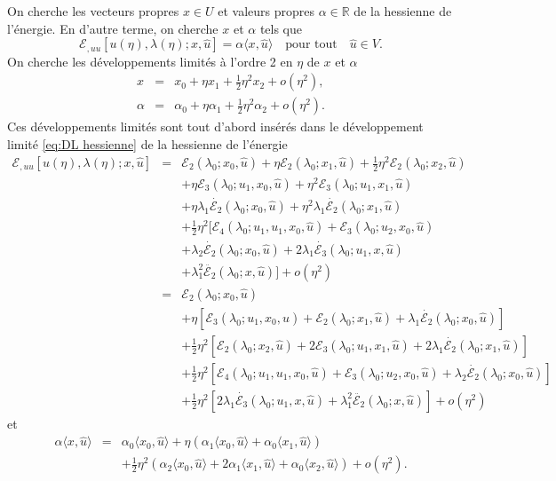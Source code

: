 \documentclass{article}
\begin{document}
On cherche les vecteurs propres $x∈U$ et valeurs propres $\alpha \in
\mathbb{R}$ de la hessienne de l'énergie. En d'autre terme, on cherche $x$
et $\alpha$ tels que
\begin{equation}
  \mathcal{E}_{, u  u} [u (\eta), λ (\eta) ; x, \hat{u}] =
  \alpha \langle x, \hat{u} \rangle \quad \text{pour tout} \quad \hat{u} \in
  V.
\end{equation}
On cherche les développements limités à l'ordre 2 en $\eta$ de $x$
et $\alpha$
\begin{eqnarray*}
  x & = & x_0 + \eta x_1 + \tfrac{1}{2} \eta^2 x_2 + o (\eta^2),\\
  \alpha & = & \alpha_0 + \eta \alpha_1 + \tfrac{1}{2} \eta^2 \alpha_2 + o
  (\eta^2) .
\end{eqnarray*}
Ces développements limités sont tout d'abord insérés dans le
développement limité \eqref{eq:DL hessienne} de la hessienne de
l'énergie
\begin{eqnarray*}
  \mathcal{E}_{, u  u} [u (\eta), λ (\eta) ; x, \hat{u}] & = &
  \mathcal{E}_2 (λ_0 ; x_0, \hat{u}) + \eta \mathcal{E}_2 (λ_0 ;
  x_1, \hat{u}) + \tfrac{1}{2} \eta^2 \mathcal{E}_2 (λ_0 ; x_2,
  \hat{u})\\
  &  & + \eta \mathcal{E}_3 (λ_0 ; u_1, x_0, \hat{u}) + \eta^2
  \mathcal{E}_3 (λ_0 ; u_1, x_1, \hat{u})\\
  &  & + \eta λ_1  \dot{\mathcal{E}_2} (λ_0 ; x_0, \hat{u}) +
  \eta^2 λ_1  \dot{\mathcal{E}_2} (λ_0 ; x_1, \hat{u})\\
  &  & + \tfrac{1}{2} \eta^2  [\mathcal{E}_4 (λ_0 ; u_1, u_1, x_0,
  \hat{u})  +\mathcal{E}_3 (λ_0 ; u_2, x_0, \hat{u})\\
  &  & + λ_2  \dot{\mathcal{E}_2} (λ_0 ; x_0, \hat{u}) + 2
  λ_1  \dot{\mathcal{E}_3} (λ_0 ; u_1, x, \hat{u})\\
  &  & + λ_1^2  \ddot{\mathcal{E}_2} (λ_0 ; x, \hat{u})
  ] + o (\eta^2)\\
  & = & \mathcal{E}_2 (λ_0 ; x_0, \hat{u})\\
  &  & + \eta [\mathcal{E}_3 (λ_0 ; u_1, x_0, \hat{u}) +\mathcal{E}_2
  (λ_0 ; x_1, \hat{u}) + λ_1  \dot{\mathcal{E}_2} (λ_0 ;
  x_0, \hat{u})]\\
  &  & + \tfrac{1}{2} \eta^2  [\mathcal{E}_2 (λ_0 ; x_2, \hat{u}) +
  2\mathcal{E}_3 (λ_0 ; u_1, x_1, \hat{u}) + 2 λ_1
  \dot{\mathcal{E}_2} (λ_0 ; x_1, \hat{u})]\\
  &  & + \tfrac{1}{2} \eta^2  [\mathcal{E}_4 (λ_0 ; u_1, u_1, x_0,
  \hat{u}) +\mathcal{E}_3 (λ_0 ; u_2, x_0, \hat{u}) + λ_2
  \dot{\mathcal{E}_2} (λ_0 ; x_0, \hat{u})]\\
  &  & + \tfrac{1}{2} \eta^2  [2 λ_1  \dot{\mathcal{E}_3} (λ_0 ;
  u_1, x, \hat{u}) + λ_1^2  \ddot{\mathcal{E}_2} (λ_0 ; x,
  \hat{u})] + o (\eta^2)
\end{eqnarray*}
et
\begin{eqnarray*}
  \alpha \langle x, \hat{u} \rangle & = & \alpha_0  \langle x_0, \hat{u}
  \rangle + \eta (\alpha_1 \langle x_0, \hat{u} \rangle + \alpha_0 \langle
  x_1, \hat{u} \rangle)\\
  &  & + \tfrac{1}{2} \eta^2  (\alpha_2 \langle x_0, \hat{u} \rangle + 2
  \alpha_1 \langle x_1, \hat{u} \rangle + \alpha_0 \langle x_2, \hat{u}
  \rangle) + o (\eta^2) .
\end{eqnarray*}
\end{document}
